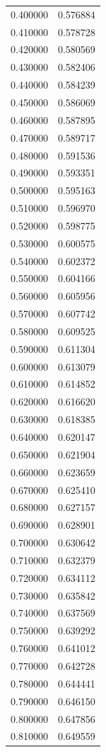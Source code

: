 \begin{tabular}{rr}
0.400000 & 0.576884 \\
0.410000 & 0.578728 \\
0.420000 & 0.580569 \\
0.430000 & 0.582406 \\
0.440000 & 0.584239 \\
0.450000 & 0.586069 \\
0.460000 & 0.587895 \\
0.470000 & 0.589717 \\
0.480000 & 0.591536 \\
0.490000 & 0.593351 \\
0.500000 & 0.595163 \\
0.510000 & 0.596970 \\
0.520000 & 0.598775 \\
0.530000 & 0.600575 \\
0.540000 & 0.602372 \\
0.550000 & 0.604166 \\
0.560000 & 0.605956 \\
0.570000 & 0.607742 \\
0.580000 & 0.609525 \\
0.590000 & 0.611304 \\
0.600000 & 0.613079 \\
0.610000 & 0.614852 \\
0.620000 & 0.616620 \\
0.630000 & 0.618385 \\
0.640000 & 0.620147 \\
0.650000 & 0.621904 \\
0.660000 & 0.623659 \\
0.670000 & 0.625410 \\
0.680000 & 0.627157 \\
0.690000 & 0.628901 \\
0.700000 & 0.630642 \\
0.710000 & 0.632379 \\
0.720000 & 0.634112 \\
0.730000 & 0.635842 \\
0.740000 & 0.637569 \\
0.750000 & 0.639292 \\
0.760000 & 0.641012 \\
0.770000 & 0.642728 \\
0.780000 & 0.644441 \\
0.790000 & 0.646150 \\
0.800000 & 0.647856 \\
0.810000 & 0.649559 \\

\end{tabular}
